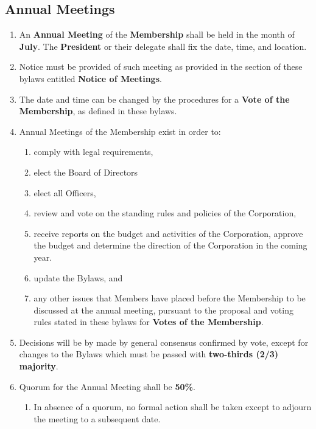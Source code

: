 \documentclass{article}
\begin{document}
\subsection{Annual Meetings}
\begin{enumerate}
    \item An \textbf{Annual Meeting} of the \textbf{Membership} shall be held in the month of \textbf{July}.  The \textbf{President} or their delegate shall fix the date, time, and location.
    \item Notice must be provided of such meeting as provided in the section of these bylaws entitled \textbf{Notice of Meetings}.
    \item The date and time can be changed by the procedures for a \textbf{Vote of the Membership}, as defined in these bylaws.
    \item Annual Meetings of the Membership exist in order to:
    \begin{enumerate}
        \item comply with legal requirements,
        \item elect the Board of Directors
        \item elect all Officers,
        \item review and vote on the standing rules and policies of the Corporation,
        \item receive reports on the budget and activities of the Corporation,
        approve the budget and determine the direction of the Corporation in the
        coming year.
        \item update the Bylaws, and
        \item any other issues that Members have placed before the Membership
        to be discussed at the annual meeting, pursuant to the proposal and
        voting rules stated in these bylaws for \textbf{Votes of the Membership}.
    \end{enumerate}
    \item Decisions will be by made by general consensus confirmed by vote,
    except for changes to the Bylaws which must be passed with \textbf{two-thirds (2/3) majority}.
    \item Quorum for the Annual Meeting shall be \textbf{50\%}.
    \begin{enumerate}
        \item In absence of a quorum, no formal action shall be taken except to
        adjourn the meeting to a subsequent date.
    \end{enumerate}
\end{enumerate}
\end{document}
